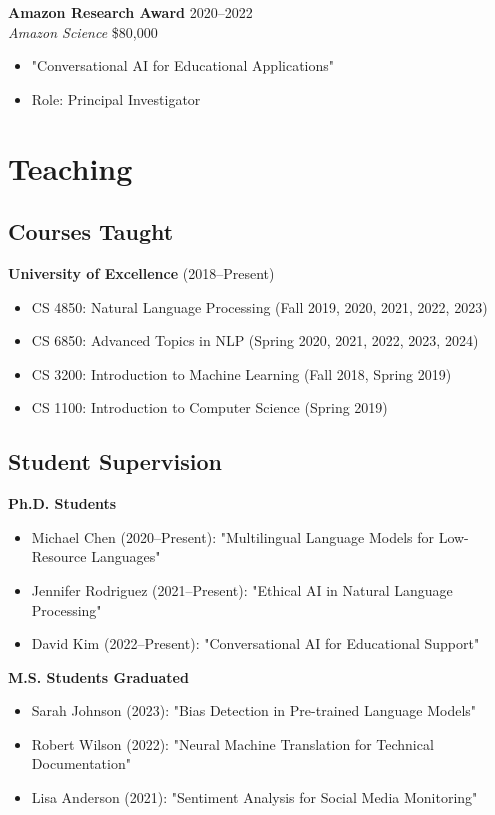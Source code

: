 \documentclass[11pt,letterpaper]{article}
\newcommand{\entry}[4]{\textbf{#1} \hfill #2 \\ \textit{#3} \hfill #4}
\begin{document}
\entry{Amazon Research Award}{2020--2022}
{Amazon Science}{\$80,000}
\begin{itemize}[noitemsep]
    \item "Conversational AI for Educational Applications"
    \item Role: Principal Investigator
\end{itemize}

\section{Teaching}

\subsection{Courses Taught}

\textbf{University of Excellence} (2018--Present)
\begin{itemize}[noitemsep]
    \item CS 4850: Natural Language Processing (Fall 2019, 2020, 2021, 2022, 2023)
    \item CS 6850: Advanced Topics in NLP (Spring 2020, 2021, 2022, 2023, 2024)
    \item CS 3200: Introduction to Machine Learning (Fall 2018, Spring 2019)
    \item CS 1100: Introduction to Computer Science (Spring 2019)
\end{itemize}

\subsection{Student Supervision}

\textbf{Ph.D. Students}
\begin{itemize}[noitemsep]
    \item Michael Chen (2020--Present): "Multilingual Language Models for Low-Resource Languages"
    \item Jennifer Rodriguez (2021--Present): "Ethical AI in Natural Language Processing"
    \item David Kim (2022--Present): "Conversational AI for Educational Support"
\end{itemize}

\textbf{M.S. Students Graduated}
\begin{itemize}[noitemsep]
    \item Sarah Johnson (2023): "Bias Detection in Pre-trained Language Models"
    \item Robert Wilson (2022): "Neural Machine Translation for Technical Documentation"
    \item Lisa Anderson (2021): "Sentiment Analysis for Social Media Monitoring"
\end{itemize}
\end{document}

